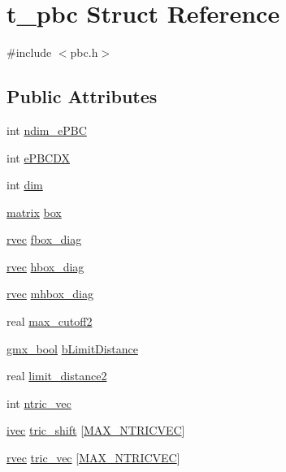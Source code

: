 \hypertarget{structt__pbc}{\section{t\-\_\-pbc \-Struct \-Reference}
\label{structt__pbc}
}


{\ttfamily \#include $<$pbc.\-h$>$}

\subsection*{\-Public \-Attributes}
\begin{DoxyCompactItemize}
\item 
int \hyperlink{structt__pbc_ac7bd1e5ce86b5101290ae7e608a36b86}{ndim\-\_\-e\-P\-B\-C}
\item 
int \hyperlink{structt__pbc_a67ca9e136837b5a09f45b2764c42191b}{e\-P\-B\-C\-D\-X}
\item 
int \hyperlink{structt__pbc_ad54855fa0733f3c75444af6dc1528636}{dim}
\item 
\hyperlink{share_2template_2gromacs_2types_2simple_8h_a7ea9c2a830d3f743b887387e33645a83}{matrix} \hyperlink{structt__pbc_aca34499dbcda948eeed8768db91d74a2}{box}
\item 
\hyperlink{share_2template_2gromacs_2types_2simple_8h_aa02a552a4abd2f180c282a083dc3a999}{rvec} \hyperlink{structt__pbc_a80f61f863ae0f86d1096f317afbf232f}{fbox\-\_\-diag}
\item 
\hyperlink{share_2template_2gromacs_2types_2simple_8h_aa02a552a4abd2f180c282a083dc3a999}{rvec} \hyperlink{structt__pbc_aa9fd2567b017ba23928edb109aae1fd6}{hbox\-\_\-diag}
\item 
\hyperlink{share_2template_2gromacs_2types_2simple_8h_aa02a552a4abd2f180c282a083dc3a999}{rvec} \hyperlink{structt__pbc_a99115cf054cd015a6320f2c7a3decb95}{mhbox\-\_\-diag}
\item 
real \hyperlink{structt__pbc_a0648f104170187ab2a5656e7c16323d6}{max\-\_\-cutoff2}
\item 
\hyperlink{include_2types_2simple_8h_a8fddad319f226e856400d190198d5151}{gmx\-\_\-bool} \hyperlink{structt__pbc_af1d0b57f71d11510cd403b2a32644def}{b\-Limit\-Distance}
\item 
real \hyperlink{structt__pbc_addc09962a888ff853cf831b06342c7d6}{limit\-\_\-distance2}
\item 
int \hyperlink{structt__pbc_aa988d855d114cf5c595d3d2c8adeeeb9}{ntric\-\_\-vec}
\item 
\hyperlink{share_2template_2gromacs_2types_2simple_8h_a74f6ffdb4a9c1764f5293969d8c681b6}{ivec} \hyperlink{structt__pbc_a1d8482139f9f5080deecddb23c5257fc}{tric\-\_\-shift} \mbox{[}\hyperlink{share_2template_2gromacs_2types_2pbc_8h_a6632a3ce629836bf5f50b6b66eda7e32}{\-M\-A\-X\-\_\-\-N\-T\-R\-I\-C\-V\-E\-C}\mbox{]}
\item 
\hyperlink{share_2template_2gromacs_2types_2simple_8h_aa02a552a4abd2f180c282a083dc3a999}{rvec} \hyperlink{structt__pbc_a57973718dabba5bab00a6b395f76e140}{tric\-\_\-vec} \mbox{[}\hyperlink{share_2template_2gromacs_2types_2pbc_8h_a6632a3ce629836bf5f50b6b66eda7e32}{\-M\-A\-X\-\_\-\-N\-T\-R\-I\-C\-V\-E\-C}\mbox{]}
\end{DoxyCompactItemize}


